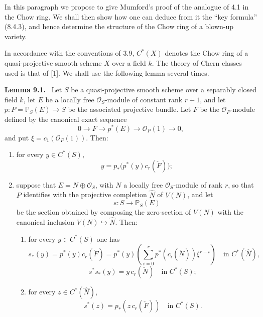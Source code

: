 \documentclass[11pt]{article}
\newenvironment{statement}[1]{\par\medskip\noindent\textbf{#1.}\ }{\par\medskip}
\begin{document}
In this paragraph we propose to give Mumford's proof of the analogue of 4.1 in the Chow ring. We shall then show how one can deduce from it the ``key formula'' (8.4.3), and hence determine the structure of the Chow ring of a blown-up variety.

In accordance with the conventions of 3.9, $C^*(X)$ denotes the Chow ring of a quasi-projective smooth scheme $X$ over a field $k$. The theory of Chern classes used is that of [1]. We shall use the following lemma several times.

\begin{statement}{Lemma 9.1}
Let $S$ be a quasi-projective smooth scheme over a separably closed field $k$, let $E$ be a locally free $\mathcal O_S$-module of constant rank $r+1$, and let $p:P=\mathbb P_S(E)\to S$ be the associated projective bundle. Let $F$ be the $\mathcal O_P$-module defined by the canonical exact sequence
\[
0\to F\to p^*(E)\to\mathcal O_P(1)\to0,
\tag{9.1.0}
\]
and put $\xi=c_1(\mathcal O_P(1))$. Then:
\begin{enumerate}[label=(\roman*)]
\item for every $y\in C^*(S)$,
\[
y=p_*\bigl(p^*(y)c_r(\check F)\bigr);
\tag{9.1.1}
\]
\item suppose that $E=N\oplus\mathcal O_S$, with $N$ a locally free $\mathcal O_S$-module of rank $r$, so that $P$ identifies with the projective completion $\widehat N$ of $V(N)$, and let
\[
s:S\to\mathbb P_S(E)
\]
be the section obtained by composing the zero-section of $V(N)$ with the canonical inclusion $V(N)\hookrightarrow\widehat N$. Then:
\begin{enumerate}[label=(\alph*)]
\item for every $y\in C^*(S)$ one has
\[
s_*(y)=p^*(y)c_r(\check F)=p^*(y)\left(\sum_{i=0}^r p^*(c_i(\check N))\xi^{r-i}\right)
\quad\text{in }C^*(\widehat N),
\tag{9.1.2}
\]
\[
s^*s_*(y)=y\,c_r(\check N)\quad\text{in }C^*(S);
\tag{9.1.3}
\]
\item for every $z\in C^*(\widehat N)$,
\[
s^*(z)=p_*(z\,c_r(\check F))\quad\text{in }C^*(S).
\tag{9.1.4}
\]
\end{enumerate}
\end{enumerate}
\end{statement}
\end{document}
